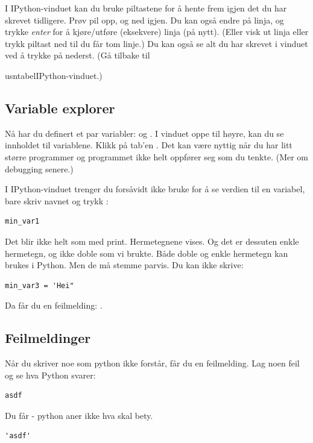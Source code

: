 I IPython-vinduet kan du bruke piltastene for å hente frem igjen det du har skrevet tidligere. Prøv pil opp, og ned igjen. Du kan også endre på linja, og trykke {\em enter} for å kjøre/utføre (eksekvere) linja (på nytt). (Eller visk ut linja eller trykk piltast ned til du får tom linje.) Du kan også se alt du har skrevet i vinduet ved å trykke på  nederst. (Gå tilbake til {usntabel{IPython}-vinduet.) 

\subsection{Variable explorer}

Nå har du definert et par variabler:  og . I vinduet oppe til høyre, kan du se innholdet til variablene. Klikk på tab'en . Det kan være nyttig når du har litt større programmer og programmet ikke helt oppfører seg som du tenkte. (Mer om debugging senere.)

I IPython-vinduet trenger du forsåvidt ikke bruke  for å se verdien til en variabel, bare skriv navnet og trykk :
\begin{lstlisting}
min_var1
\end{lstlisting}

Det blir ikke helt som med print. Hermetegnene vises. Og det er dessuten enkle hermetegn, og ikke doble som vi brukte. Både doble og enkle hermetegn kan brukes i Python. Men de må stemme parvis. Du kan ikke skrive:

\begin{lstlisting}
min_var3 = 'Hei"
\end{lstlisting}

Da får du en feilmelding: .

\subsection{Feilmeldinger}

Når du skriver noe som python ikke forstår, får du en feilmelding.  Lag noen feil og se hva Python svarer:


\begin{lstlisting}
asdf
\end{lstlisting}

Du får  - python aner ikke hva  skal bety.

\begin{lstlisting}
'asdf'
\end{lstlisting}

}
